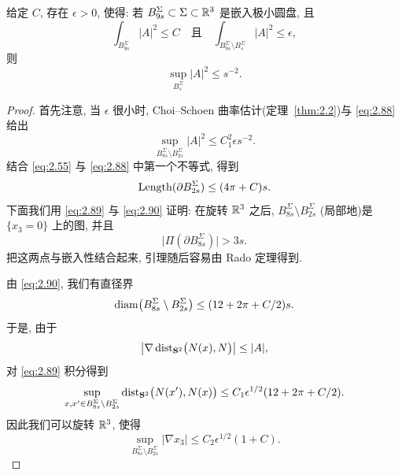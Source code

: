 \begin{lemma}
\label{lem:2.18}
给定 $C$, 存在 $\epsilon>0$, 使得: 若
$B_{9s}^{\Sigma}\subset\Sigma\subset\mathbb{R}^3$ 是嵌入极小圆盘, 且
\begin{equation}
\int_{B_{9s}^{\Sigma}}|A|^{2}\leq C
 \quad\text{且}\quad
 \int_{B_{9s}^{\Sigma}\setminus B_s^{\Sigma}}|A|^{2}\leq\epsilon,
\label{eq:2.88}
\end{equation}
则
\[
\sup_{B_s^{\Sigma}}|A|^{2}\leq s^{-2}.
\]
\end{lemma}

\begin{proof}
首先注意, 当 $\epsilon$ 很小时, Choi--Schoen 曲率估计(定理~\ref{thm:2.2})与
\eqref{eq:2.88} 给出
\begin{equation}
\sup_{B_{8s}^{\Sigma}\setminus B_{2s}^{\Sigma}}|A|^{2}
 \leq C_1^{2}\epsilon s^{-2}.
\label{eq:2.89}
\end{equation}
结合 \eqref{eq:2.55} 与 \eqref{eq:2.88} 中第一个不等式, 得到
\begin{equation}
\operatorname{Length}(\partial B_{2s}^{\Sigma})\leq(4\pi+C)s.
\label{eq:2.90}
\end{equation}
下面我们用 \eqref{eq:2.89} 与 \eqref{eq:2.90} 证明: 在旋转 $\mathbb{R}^3$ 之后,
$B_{8s}^{\Sigma}\setminus B_{2s}^{\Sigma}$ (局部地)是 $\{x_3=0\}$ 上的图,
并且
\begin{equation}
\bigl|\Pi(\partial B_{8s}^{\Sigma})\bigr|>3s.
\label{eq:2.91}
\end{equation}
把这两点与嵌入性结合起来, 引理随后容易由 Rado 定理得到.

由 \eqref{eq:2.90}, 我们有直径界
\[
\operatorname{diam}\bigl(B_{8s}^{\Sigma}\setminus B_{2s}^{\Sigma}\bigr)
 \leq(12+2\pi+C/2)s.
\]
于是, 由于
\[
\bigl|\nabla\operatorname{dist}_{\mathbf{S}^{2}}\bigl(N(x),N\bigr)\bigr|\leq|A|,
\]
对 \eqref{eq:2.89} 积分得到
\begin{equation}
\sup_{x,x'\in B_{8s}^{\Sigma}\setminus B_{2s}^{\Sigma}}
 \operatorname{dist}_{\mathbf{S}^{2}}\bigl(N(x'),N(x)\bigr)
 \leq C_1\epsilon^{1/2}(12+2\pi+C/2).
\label{eq:2.92}
\end{equation}
因此我们可以旋转 $\mathbb{R}^3$, 使得
\begin{equation}
\sup_{B_{8s}^{\Sigma}\setminus B_{2s}^{\Sigma}}|\nabla x_3|
 \leq C_2\epsilon^{1/2}(1+C).
\label{eq:2.93}
\end{equation}


\end{proof}
